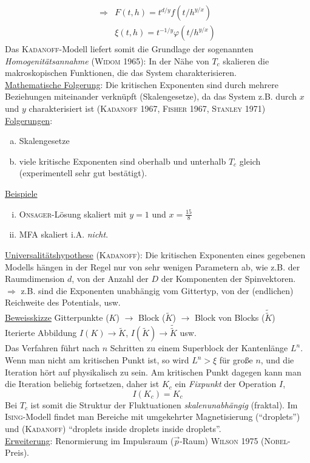 \begin{enumerate}[A)]
\begin{equation}
\begin{split}
            \Rightarrow & F(t, h) = t^{d/y} f(t/h^{y/x}) \\
            & \xi(t, h) = t^{-1/y} \varphi(t/h^{y/x})
        \end{split}
    \end{equation}
    Das \textsc{Kadanoff}-Modell liefert somit die Grundlage der sogenannten \emph{Homogenitätsannahme} (\textsc{Widom} 1965):
    In der Nähe von $T_c$ skalieren die makroskopischen Funktionen, die das System charakterisieren. \\
    \underline{Mathematische Folgerung}: Die kritischen Exponenten sind durch mehrere Beziehungen miteinander verknüpft (Skalengesetze), da das
    System z.B. durch $x$ und $y$ charakterisiert ist (\textsc{Kadanoff} 1967, \textsc{Fisher} 1967, \textsc{Stanley} 1971) \\
    \underline{Folgerungen}:
    \begin{enumerate}[a)]
        \item Skalengesetze
        \item viele kritische Exponenten sind oberhalb und unterhalb $T_c$ gleich (experimentell sehr gut bestätigt).
    \end{enumerate}
    \underline{Beispiele}
    \begin{enumerate}[i)]
        \item \textsc{Onsager}-Lösung skaliert mit $y=1$ und $x=\frac{15}{8}$
        \item MFA skaliert i.A. \emph{nicht}.
    \end{enumerate}
    \underline{Universalitätshypothese} (\textsc{Kadanoff}): Die kritischen Exponenten eines gegebenen Modells hängen in der Regel nur von sehr 
    wenigen Parametern ab, wie z.B. der Raumdimension $d$, von der Anzahl der $D$ der Komponenten der Spinvektoren. \\
    $\Rightarrow$ z.B. sind die Exponenten unabhängig vom Gittertyp, von der (endlichen) Reichweite des Potentials, usw. \\
    \underline{Beweisskizze} Gitterpunkte ($K$) $\rightarrow$ Block ($\tilde{K}$) $\rightarrow$ Block von Blocks ($\tilde{\tilde{K}}$) \\
    Iterierte Abbildung $I(K) \rightarrow \tilde{K}$, $I(\tilde{K}) \rightarrow \tilde{\tilde{K}}$ usw. \\
    Das Verfahren führt nach $n$ Schritten zu einem Superblock der Kantenlänge $L^n$. Wenn man nicht am kritischen Punkt ist, so wird $L^n > \xi$
    für große $n$, und die Iteration hört auf physikalisch zu sein. Am kritischen Punkt dagegen kann man die Iteration beliebig fortsetzen,
    daher ist $K_c$ ein \emph{Fixpunkt} der Operation $I$,
    \begin{equation}
        I(K_c) = K_c
    \end{equation}
    Bei $T_c$ ist somit die Struktur der Fluktuationen \emph{skalenunabhängig} (fraktal). Im \textsc{Ising}-Modell findet man Bereiche mit 
    umgekehrter Magnetisierung ("`droplets"') und (\textsc{Kadanoff}) "`droplets inside droplets inside droplets"'. \\
    \underline{Erweiterung}: Renormierung im Impulsraum ($\vec{p}$-Raum) \textsc{Wilson} 1975 (\textsc{Nobel}-Preis).
\end{enumerate}